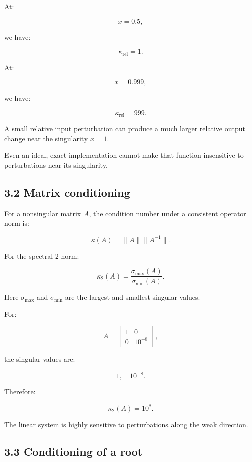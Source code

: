 At:

\[ x=0.5, \]

we have:

\[ \kappa_{\mathrm{rel}}=1. \]

At:

\[ x=0.999, \]

we have:

\[ \boxed{\kappa_{\mathrm{rel}}=999}. \]

A small relative input perturbation can produce a much larger relative output change near the singularity \(x=1\).

Even an ideal, exact implementation cannot make that function insensitive to perturbations near its singularity.

\subsection{3.2 Matrix conditioning}\label{02-foundations-ii-ch028-matrix-conditioning}

\hypertarget{02-foundations-ii-ch028-matrix-conditioning}{}

For a nonsingular matrix \(A\), the condition number under a consistent operator norm is:

\[ \boxed{ \kappa(A)=\|A\|\|A^{-1}\| }. \]

For the spectral 2-norm:

\[ \boxed{ \kappa_2(A) = \frac{\sigma_{\max}(A)}{\sigma_{\min}(A)} }. \]

Here \(\sigma_{\max}\) and \(\sigma_{\min}\) are the largest and smallest singular values.

For:

\[ A= \begin{bmatrix} 1&0\\ 0&10^{-8} \end{bmatrix}, \]

the singular values are:

\[ 1,\quad10^{-8}. \]

Therefore:

\[ \boxed{\kappa_2(A)=10^8}. \]

The linear system is highly sensitive to perturbations along the weak direction.

\subsection{3.3 Conditioning of a root}\label{02-foundations-ii-ch028-conditioning-of-a-root}

